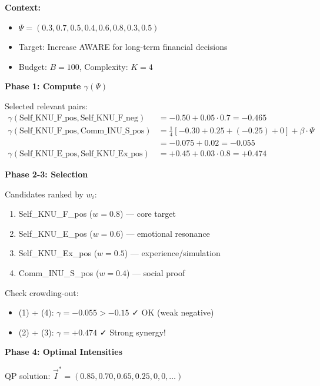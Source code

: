 \begin{tcolorbox}[colback=yellow!5!white, colframe=yellow!75!black,
    title=\textbf{Example: Retirement Savings Intervention}]

\textbf{Context:}
\begin{itemize}[nosep]
    \item $\Psi = (0.3, 0.7, 0.5, 0.4, 0.6, 0.8, 0.3, 0.5)$
    \item Target: Increase AWARE for long-term financial decisions
    \item Budget: $B = 100$, Complexity: $K = 4$
\end{itemize}

\textbf{Phase 1: Compute $\gamma(\Psi)$}

Selected relevant pairs:
\begin{align*}
\gamma(\text{Self\_KNU\_F\_pos}, \text{Self\_KNU\_F\_neg}) &= -0.50 + 0.05 \cdot 0.7 = -0.465 \\
\gamma(\text{Self\_KNU\_F\_pos}, \text{Comm\_INU\_S\_pos}) &= \frac{1}{4}[-0.30 + 0.25 + (-0.25) + 0] + \beta \cdot \Psi \\
&= -0.075 + 0.02 = -0.055 \\
\gamma(\text{Self\_KNU\_E\_pos}, \text{Self\_KNU\_Ex\_pos}) &= +0.45 + 0.03 \cdot 0.8 = +0.474
\end{align*}

\textbf{Phase 2-3: Selection}

Candidates ranked by $w_i$:
\begin{enumerate}[nosep]
    \item Self\_KNU\_F\_pos ($w = 0.8$) — core target
    \item Self\_KNU\_E\_pos ($w = 0.6$) — emotional resonance
    \item Self\_KNU\_Ex\_pos ($w = 0.5$) — experience/simulation
    \item Comm\_INU\_S\_pos ($w = 0.4$) — social proof
\end{enumerate}

Check crowding-out:
\begin{itemize}[nosep]
    \item (1) + (4): $\gamma = -0.055 > -0.15$ ✓ OK (weak negative)
    \item (2) + (3): $\gamma = +0.474$ ✓ Strong synergy!
\end{itemize}

\textbf{Phase 4: Optimal Intensities}

QP solution: $\vec{I}^* = (0.85, 0.70, 0.65, 0.25, 0, 0, \ldots)$


\end{tcolorbox}
